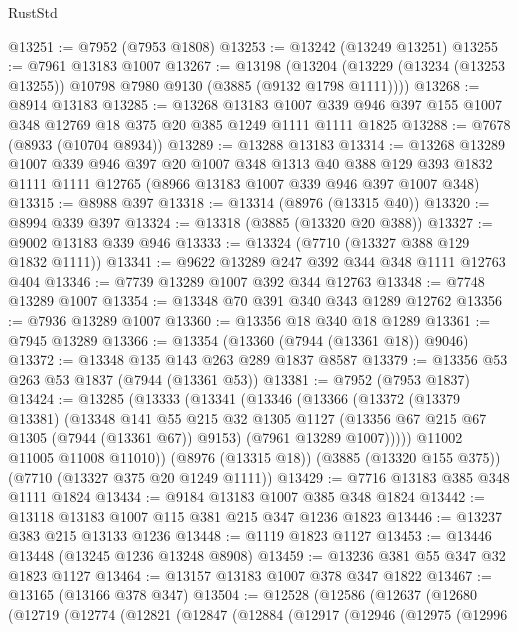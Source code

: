 \begin{lexlean}{RustStd}
\begin{coremodule}
@13251 := @7952 (@7953 @1808)
@13253 := @13242 (@13249 @13251)
@13255 := @7961 @13183 @1007
@13267 := @13198
    (@13204 (@13229 (@13234 (@13253 @13255)) @10798 @7980 @9130 (@3885 (@9132 @1798 @1111))))
@13268 := @8914 @13183
@13285 := @13268
    @13183
    @1007
    @339
    @946
    @397
    @155
    @1007
    @348
    @12769
    @18
    @375
    @20
    @385
    @1249
    @1111
    @1111
    @1825
@13288 := @7678 (@8933 (@10704 @8934))
@13289 := @13288 @13183
@13314 := @13268
    @13289
    @1007
    @339
    @946
    @397
    @20
    @1007
    @348
    @1313
    @40
    @388
    @129
    @393
    @1832
    @1111
    @1111
    @12765
    (@8966 @13183 @1007 @339 @946 @397 @1007 @348)
@13315 := @8988 @397
@13318 := @13314 (@8976 (@13315 @40))
@13320 := @8994 @339 @397
@13324 := @13318 (@3885 (@13320 @20 @388))
@13327 := @9002 @13183 @339 @946
@13333 := @13324 (@7710 (@13327 @388 @129 @1832 @1111))
@13341 := @9622 @13289 @247 @392 @344 @348 @1111 @12763 @404
@13346 := @7739 @13289 @1007 @392 @344 @12763
@13348 := @7748 @13289 @1007
@13354 := @13348 @70 @391 @340 @343 @1289 @12762
@13356 := @7936 @13289 @1007
@13360 := @13356 @18 @340 @18 @1289
@13361 := @7945 @13289
@13366 := @13354 (@13360 (@7944 (@13361 @18)) @9046)
@13372 := @13348 @135 @143 @263 @289 @1837 @8587
@13379 := @13356 @53 @263 @53 @1837 (@7944 (@13361 @53))
@13381 := @7952 (@7953 @1837)
@13424 := @13285
    (@13333
      (@13341
        (@13346
          (@13366
            (@13372
              (@13379 @13381)
              (@13348
                @141
                @55
                @215
                @32
                @1305
                @1127
                (@13356 @67 @215 @67 @1305 (@7944 (@13361 @67)) @9153)
                (@7961 @13289 @1007)))))
        @11002
        @11005
        @11008
        @11010))
    (@8976 (@13315 @18))
    (@3885 (@13320 @155 @375))
    (@7710 (@13327 @375 @20 @1249 @1111))
@13429 := @7716 @13183 @385 @348 @1111 @1824
@13434 := @9184 @13183 @1007 @385 @348 @1824
@13442 := @13118 @13183 @1007 @115 @381 @215 @347 @1236 @1823
@13446 := @13237 @383 @215 @13133 @1236
@13448 := @1119 @1823 @1127
@13453 := @13446 @13448 (@13245 @1236 @13248 @8908)
@13459 := @13236 @381 @55 @347 @32 @1823 @1127
@13464 := @13157 @13183 @1007 @378 @347 @1822
@13467 := @13165 (@13166 @378 @347)
@13504 := @12528
    (@12586
      (@12637
        (@12680
          (@12719
            (@12774
              (@12821
                (@12847
                  (@12884
                    (@12917
                      (@12946
                        (@12975
                          (@12996

\end{coremodule}
\end{lexlean}
